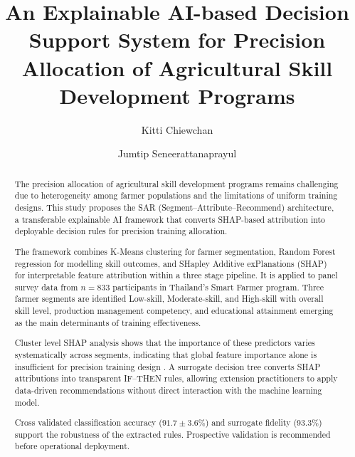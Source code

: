 \documentclass[3p,twocolumn,authoryear]{elsarticle}
\begin{document}
\begin{frontmatter}

\title{An Explainable AI-based Decision Support System for Precision
       Allocation of Agricultural Skill Development Programs}

\author[inst1]{Kitti Chiewchan}
\author[inst2]{Jumtip Seneerattanaprayul}

\address[inst1]{Computer Education, Faculty of Education,
  Bansomdejchaopraya Rajabhat University,
  1061 Issaraphap Road, Hirunrujee, Thonburi, Bangkok 10600, Thailand}
\address[inst2]{Department of Agricultural Economics,
  Faculty of Economics, Kasetsart University,
  50 Ngam Wong Wan Road, Ladyao, Jatujak, Bangkok 10110, Thailand}

\begin{abstract}

The precision allocation of agricultural skill development programs remains
challenging due to heterogeneity among farmer populations and the limitations of
uniform training designs.
This study proposes the SAR (Segment--Attribute--Recommend) architecture, a
transferable explainable AI framework that converts SHAP-based attribution into
deployable decision rules for precision training allocation.

The framework combines K-Means clustering for farmer segmentation, Random Forest
regression for modelling skill outcomes, and SHapley Additive exPlanations (SHAP)
for interpretable feature attribution within a three stage pipeline.
It is applied to panel survey data from $n = 833$ participants in Thailand's Smart
Farmer program.
Three farmer segments are identified Low-skill, Moderate-skill, and High-skill with
overall skill level, production management competency, and educational attainment
emerging as the main determinants of training effectiveness.

Cluster level SHAP analysis shows that the importance of these predictors varies
systematically across segments, indicating that global feature importance alone
is insufficient for precision training design \citep{lundberg2020}.
A surrogate decision tree converts SHAP attributions into transparent IF--THEN
rules, allowing extension practitioners to apply data-driven recommendations
without direct interaction with the machine learning model.

Cross validated classification accuracy ($91.7 \pm 3.6$\%) and surrogate fidelity
(93.3\%) support the robustness of the extracted rules.
Prospective validation is recommended before operational deployment.


\end{abstract}
\end{frontmatter}
\end{document}
